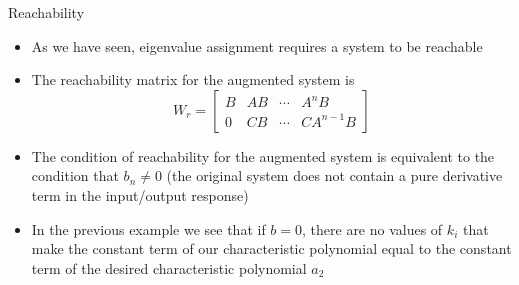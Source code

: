\documentclass{beamer-control}
\begin{document}

\begin{frame}{Reachability}
\begin{itemize}
\item As we have seen, eigenvalue assignment requires a system to be reachable
\item The reachability matrix for the augmented system is
\[W_r = \begin{bmatrix}
	B & AB & \cdots & A^n B \\
	0 & CB & \cdots & CA^{n-1}B
\end{bmatrix}\]
\item The condition of reachability for the augmented system is equivalent to the condition that $b_n\neq 0$ (the original system does not contain a pure derivative term in the input/output response)
\item In the previous example we see that if $b=0$, there are no values of $k_i$ that make the constant term of our characteristic polynomial equal to the constant term of the desired characteristic polynomial $a_2$
\end{itemize}
\end{frame}


\SUMMARYFRAME
\FINALE
\end{document}
